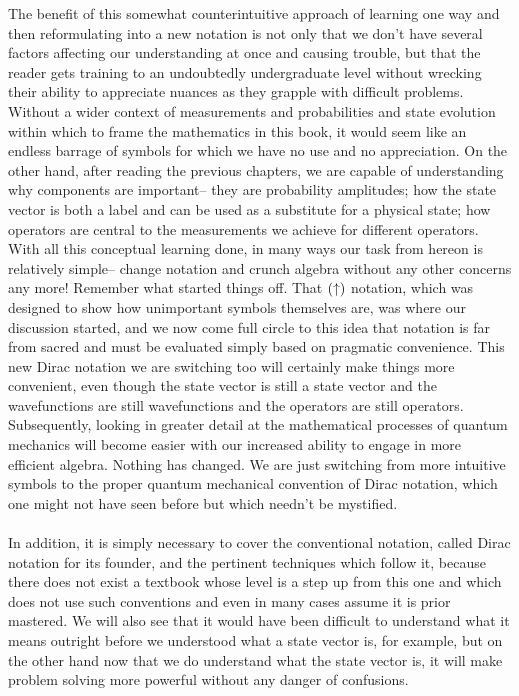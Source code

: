 The benefit of this somewhat counterintuitive approach of learning one way and then reformulating into a new notation is not only that we don't have several factors affecting our understanding at once and causing trouble, but that the reader gets training to an undoubtedly undergraduate level without wrecking their ability to appreciate nuances as they grapple with difficult problems. Without a wider context of measurements and probabilities and state evolution within which to frame the mathematics in this book, it would seem like an endless barrage of symbols for which we have no use and no appreciation. On the other hand, after reading the previous chapters, we are capable of understanding why components are important-- they are probability amplitudes; how the state vector is both a label and can be used as a substitute for a physical state; how operators are central to the measurements we achieve for different operators. With all this conceptual learning done, in many ways our task from hereon is relatively simple-- change notation and crunch algebra without any other concerns any more! Remember what started things off. That $(\uparrow)$ notation, which was designed to show how unimportant symbols themselves are, was where our discussion started, and we now come full circle to this idea that notation is far from sacred and must be evaluated simply based on pragmatic convenience. This new Dirac notation we are switching too will certainly make things more convenient, even though the state vector is still a state vector and the wavefunctions are still wavefunctions and the operators are still operators. Subsequently, looking in greater detail at the mathematical processes of quantum mechanics will become easier with our increased ability to engage in more efficient algebra. Nothing has changed. We are just switching from more intuitive symbols to the proper quantum mechanical convention of Dirac notation, which one might not have seen before but which needn't be mystified.
\\\\
In addition, it is simply necessary to cover the conventional notation, called Dirac notation for its founder, and the pertinent techniques which follow it, because there does not exist a textbook whose level is a step up from this one and which does not use such conventions and even in many cases assume it is prior mastered. We will also see that it would have been difficult to understand what it means outright before we understood what a state vector is, for example, but on the other hand now that we do understand what the state vector is, it will make problem solving more powerful without any danger of confusions. 
